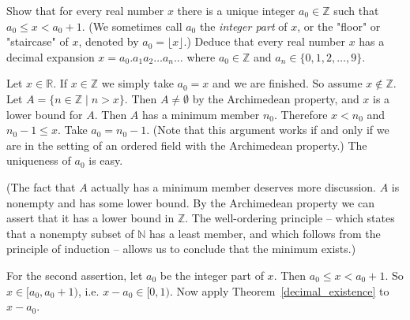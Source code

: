 \documentclass[11pt,dvipsnames]{book}
\numberwithin{figure}{section} %
\numberwithin{table}{section} %
\begin{document}
\begin{exercise}
Show that for every real number $x$ there is a unique integer $a_0 \in \mathbb{Z}$ such that $a_0 \leq x < a_0 +1$. (We sometimes call $a_0$ the {\em integer part} of $x$, or the "floor" or "staircase" of $x$, denoted by $a_0 = \lfloor x \rfloor$.) Deduce that every real number $x$ has a decimal expansion
$x = a_0.a_1 a_2 \dots a_n \dots$
where $a_0 \in \mathbb{Z}$ and $a_n \in \{0,1,2, \dots, 9\}$.
\begin{solution}
Let $x \in \mathbb{R}$. If $x \in \mathbb{Z}$ we simply take $a_0 = x$ and we are finished. So assume $x \notin \mathbb{Z}$. Let $A= \{ n \in \mathbb{Z} \; | \; n > x\}$. Then $A \neq \emptyset$ by the Archimedean property, and $x$ is a lower bound for $A$. Then $A$ has a minimum member $n_0$. Therefore $x < n_0$ and $ n_0 - 1 \leq x$. Take $a_0 = n_0 -1$. (Note that this argument works if and only if we are in the setting of an ordered field with the Archimedean property.)
The uniqueness of $a_0$ is easy.

(The fact that $A$ actually has a minimum member deserves more discussion. $A$ is nonempty and has some lower bound. By the Archimedean property we can assert that it has a lower bound in $\mathbb{Z}$. The well-ordering principle -- which states that a nonempty subset of $\mathbb{N}$ has a least member, and which follows from the principle of induction -- allows us to conclude that the minimum exists.)

\medskip
For the second assertion, let $a_{0}$ be the integer part of $x$. Then
$a_{0}\leq x<a_{0}+1$.
So $x\in [a_{0},a_{0}+1)$, i.e. $x - a_0 \in [0,1)$. Now apply Theorem~\ref{decimal_existence} to $x - a_0$.
\end{solution}
\end{exercise}
\end{document}
